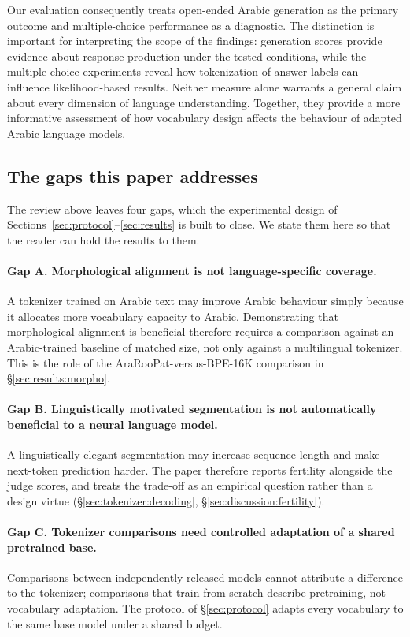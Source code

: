 \documentclass[a4paper,fleqn]{cas-sc}
\begin{document}
Our evaluation consequently treats open-ended Arabic generation as the primary outcome and multiple-choice performance as a diagnostic. The distinction is important for interpreting the scope of the findings: generation scores provide evidence about response production under the tested conditions, while the multiple-choice experiments reveal how tokenization of answer labels can influence likelihood-based results. Neither measure alone warrants a general claim about every dimension of language understanding. Together, they provide a more informative assessment of how vocabulary design affects the behaviour of adapted Arabic language models.

\subsection{The gaps this paper addresses}
\label{sec:related:gaps}

The review above leaves four gaps, which the experimental design of Sections~\ref{sec:protocol}--\ref{sec:results} is built to close. We state them here so that the reader can hold the results to them.

\paragraph{Gap A. Morphological alignment is not language-specific coverage.} A tokenizer trained on Arabic text may improve Arabic behaviour simply because it allocates more vocabulary capacity to Arabic. Demonstrating that morphological alignment is beneficial therefore requires a comparison against an Arabic-trained baseline of matched size, not only against a multilingual tokenizer. This is the role of the AraRooPat-versus-BPE-16K comparison in \S\ref{sec:results:morpho}.

\paragraph{Gap B. Linguistically motivated segmentation is not automatically beneficial to a neural language model.} A linguistically elegant segmentation may increase sequence length and make next-token prediction harder. The paper therefore reports fertility alongside the judge scores, and treats the trade-off as an empirical question rather than a design virtue (\S\ref{sec:tokenizer:decoding}, \S\ref{sec:discussion:fertility}).

\paragraph{Gap C. Tokenizer comparisons need controlled adaptation of a shared pretrained base.} Comparisons between independently released models cannot attribute a difference to the tokenizer; comparisons that train from scratch describe pretraining, not vocabulary adaptation. The protocol of \S\ref{sec:protocol} adapts every vocabulary to the same base model under a shared budget.
\end{document}
